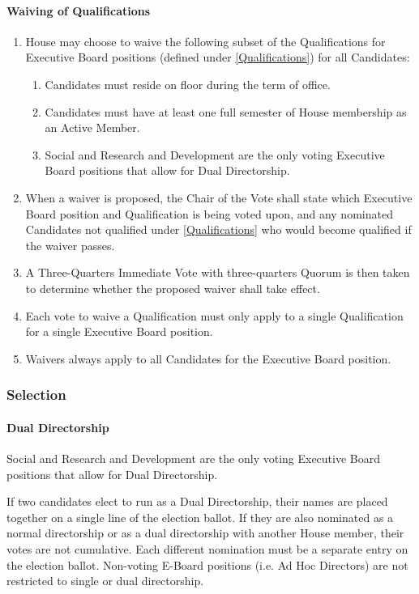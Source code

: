 \documentclass{article}
\newcommand{\asubsection}[1]{\subsubsection{#1} \label{#1}}
\newcommand{\asubsubsection}[1]{\paragraph{#1} \label{#1}}
\begin{document}
\asubsubsection{Waiving of Qualifications}
\begin{enumerate}
  \item House may choose to waive the following subset of the Qualifications for Executive Board positions (defined under \ref{Qualifications}) for all Candidates:
    \begin{enumerate}
      \item Candidates must reside on floor during the term of office.
      \item Candidates must have at least one full semester of House membership as an Active Member.
      \item Social and Research and Development are the only voting Executive Board positions that allow for Dual Directorship.
    \end{enumerate}
  \item When a waiver is proposed, the Chair of the Vote shall state which Executive Board position and Qualification is being voted upon, and any nominated Candidates not qualified under \ref{Qualifications} who would become qualified if the waiver passes.
  \item A Three-Quarters Immediate Vote with three-quarters Quorum is then taken to determine whether the proposed waiver shall take effect.
  \item Each vote to waive a Qualification must only apply to a single Qualification for a single Executive Board position.
  \item Waivers always apply to all Candidates for the Executive Board position.
\end{enumerate}

\asubsection{Selection}
\asubsubsection{Dual Directorship}
Social and Research and Development are the only voting Executive Board positions that allow for Dual Directorship.

If two candidates elect to run as a Dual Directorship, their names are placed together on a single line of the election ballot.
If they are also nominated as a normal directorship or as a dual directorship with another House member, their votes are not cumulative.
Each different nomination must be a separate entry on the election ballot.
Non-voting E-Board positions (i.e. Ad Hoc Directors) are not restricted to single or dual directorship.
\end{document}
